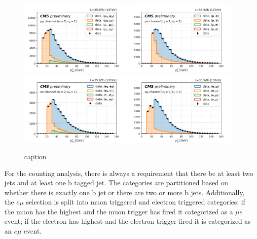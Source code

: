 \begin{figure}[ht]
    \centering
    \includegraphics[width=0.49\textwidth]{chapters/Analysis/sectionSelection/figures/trgLep_mumu.png}
    \includegraphics[width=0.49\textwidth]{chapters/Analysis/sectionSelection/figures/trgLep_emu.png}
    \includegraphics[width=0.49\textwidth]{chapters/Analysis/sectionSelection/figures/trgLep_ee.png}
    \includegraphics[width=0.49\textwidth]{chapters/Analysis/sectionSelection/figures/trgLep_emu2.png}
    \caption{caption}
    \label{fig:analysis:selection:trigger}
\end{figure}


For the counting analysis, there is always a requirement that there be at least two jets and at least one b tagged jet. The categories are partitioned based on whether there is exactly one b jet or there are two or more b jets.  Additionally, the $e\mu$ selection is split into muon triggered and electron triggered categories: if the muon has the highest \pt and the muon trigger has fired it categorized as a $\mu e$ event; if the electron has highest \pt and the electron trigger fired it is categorized as an $e \mu$ event.




\FloatBarrier


